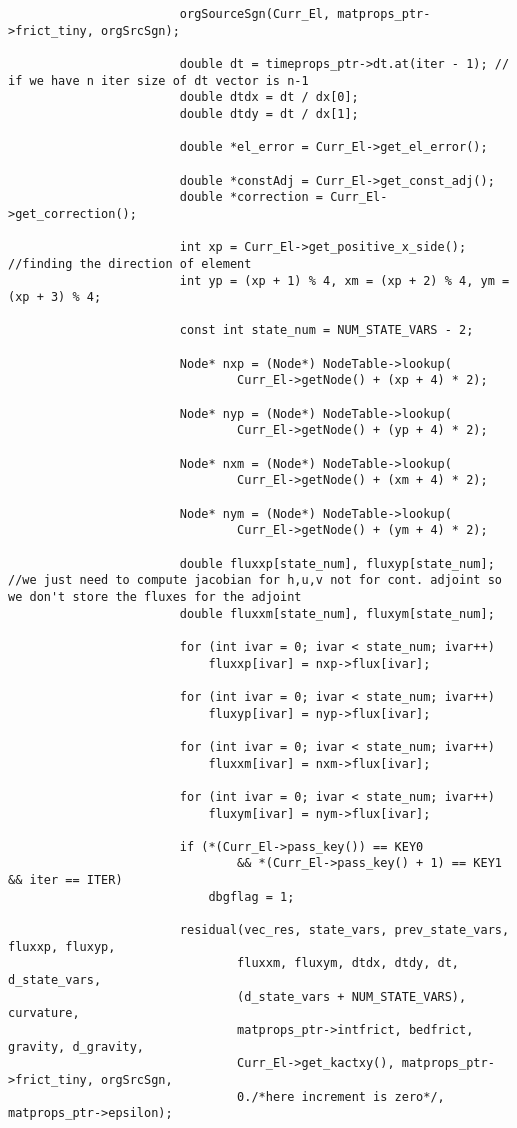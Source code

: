 \documentclass[a4paper,10pt]{article}
\begin{document}
\begin{lstlisting}
						orgSourceSgn(Curr_El, matprops_ptr->frict_tiny, orgSrcSgn);

						double dt = timeprops_ptr->dt.at(iter - 1); // if we have n iter size of dt vector is n-1
						double dtdx = dt / dx[0];
						double dtdy = dt / dx[1];

						double *el_error = Curr_El->get_el_error();

						double *constAdj = Curr_El->get_const_adj();
						double *correction = Curr_El->get_correction();

						int xp = Curr_El->get_positive_x_side(); //finding the direction of element
						int yp = (xp + 1) % 4, xm = (xp + 2) % 4, ym = (xp + 3) % 4;

						const int state_num = NUM_STATE_VARS - 2;

						Node* nxp = (Node*) NodeTable->lookup(
								Curr_El->getNode() + (xp + 4) * 2);

						Node* nyp = (Node*) NodeTable->lookup(
								Curr_El->getNode() + (yp + 4) * 2);

						Node* nxm = (Node*) NodeTable->lookup(
								Curr_El->getNode() + (xm + 4) * 2);

						Node* nym = (Node*) NodeTable->lookup(
								Curr_El->getNode() + (ym + 4) * 2);

						double fluxxp[state_num], fluxyp[state_num]; //we just need to compute jacobian for h,u,v not for cont. adjoint so we don't store the fluxes for the adjoint
						double fluxxm[state_num], fluxym[state_num];

						for (int ivar = 0; ivar < state_num; ivar++)
							fluxxp[ivar] = nxp->flux[ivar];

						for (int ivar = 0; ivar < state_num; ivar++)
							fluxyp[ivar] = nyp->flux[ivar];

						for (int ivar = 0; ivar < state_num; ivar++)
							fluxxm[ivar] = nxm->flux[ivar];

						for (int ivar = 0; ivar < state_num; ivar++)
							fluxym[ivar] = nym->flux[ivar];

						if (*(Curr_El->pass_key()) == KEY0
								&& *(Curr_El->pass_key() + 1) == KEY1 && iter == ITER)
							dbgflag = 1;

						residual(vec_res, state_vars, prev_state_vars, fluxxp, fluxyp,
								fluxxm, fluxym, dtdx, dtdy, dt, d_state_vars,
								(d_state_vars + NUM_STATE_VARS), curvature,
								matprops_ptr->intfrict, bedfrict, gravity, d_gravity,
								Curr_El->get_kactxy(), matprops_ptr->frict_tiny, orgSrcSgn,
								0./*here increment is zero*/, matprops_ptr->epsilon);


\end{lstlisting}
\end{document}
